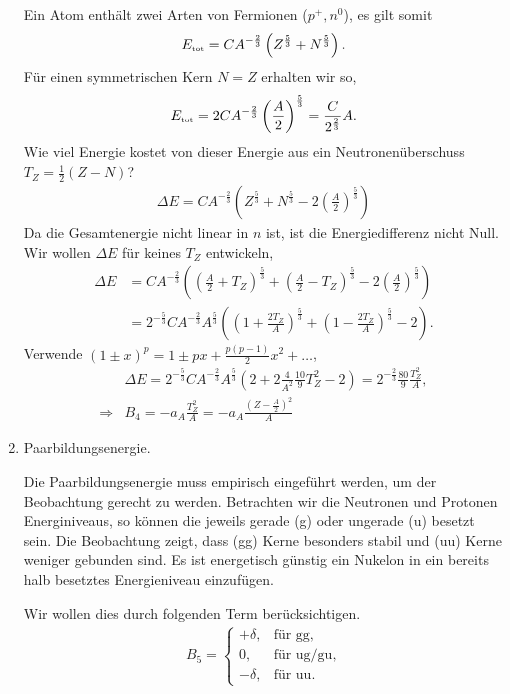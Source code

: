 \begin{enumerate}[label=\arabic{*}.)]
Ein Atom enthält zwei Arten von Fermionen ($p^+,n^0$), es gilt somit
\begin{align*}
E_{\text{\tiny tot}} = CA^{-\frac{2}{3}}\left(Z^{\frac{5}{3}} + N^{\frac{5}{3}}\right).
\end{align*}
Für einen symmetrischen Kern $N=Z$ erhalten wir so,
\begin{align*}
E_{\text{\tiny tot}} = 2CA^{-\frac{2}{3}}\left(\frac{A}{2}\right)^{\frac{5}{3}} =
\frac{C}{2^{\frac{2}{3}}}A.
\end{align*}
Wie viel Energie kostet von dieser Energie aus ein Neutronenüberschuss $T_Z =
\frac{1}{2}(Z-N)$?
\begin{align*}
\Delta E = CA^{-\frac{2}{3}}\left(Z^{\frac{5}{3}} + N^{\frac{5}{3}} -
2\left(\frac{A}{2}\right)^{\frac{5}{3}}\right)
\end{align*}
Da die Gesamtenergie nicht linear in $n$ ist, ist die Energiedifferenz nicht
Null. Wir wollen $\Delta E$ für keines $T_Z$ entwickeln,
\begin{align*}
\Delta E &= CA^{-\frac{2}{3}}\left(\left(\frac{A}{2} + T_Z\right)^{\frac{5}{3}}
+ \left(\frac{A}{2} - T_Z\right)^{\frac{5}{3}} -
2\left(\frac{A}{2}\right)^{\frac{5}{3}}\right)\\ &
= 2^{-\frac{5}{3}}CA^{-\frac{2}{3}}A^{\frac{5}{3}}\left(
\left(1+\frac{2T_Z}{A}\right)^{\frac{5}{3}}
+\left(1-\frac{2T_Z}{A}\right)^{\frac{5}{3}}
-2 \right).
\end{align*}
Verwende $(1\pm x)^{p} = 1\pm px + \frac{p(p-1)}{2}x^2 + \ldots$,
\begin{align*}
&\Delta E = 2^{-\frac{5}{3}}CA^{-\frac{2}{3}}A^{\frac{5}{3}}\left(
2  + 2\frac{4}{A^2}\frac{10}{9}T_Z^2 - 2\right) = 2^{-\frac{2}{3}}
\frac{80}{9}\frac{T_Z^2}{A},\\ \Rightarrow & B_4 = -a_A \frac{T_Z^2}{A} =
-a_A\frac{\left(Z-\frac{A}{2}\right)^2}{A}
\end{align*}
\item Paarbildungsenergie.

Die Paarbildungsenergie muss empirisch eingeführt werden, um der Beobachtung
gerecht zu werden. Betrachten wir die Neutronen und Protonen Energiniveaus, so
können die jeweils gerade (g) oder ungerade (u) besetzt sein. Die
Beobachtung zeigt, dass (gg) Kerne besonders stabil und (uu) Kerne weniger
gebunden sind. Es ist energetisch günstig ein Nukelon in ein bereits halb
besetztes Energieniveau einzufügen.

Wir wollen dies durch folgenden Term berücksichtigen.
\begin{align*}
B_5 = \begin{cases}      
+\delta, & \text{für gg},\\
0, & \text{für ug/gu},\\
-\delta, & \text{für uu}.
\end{cases}
\end{align*} 
\end{enumerate}
